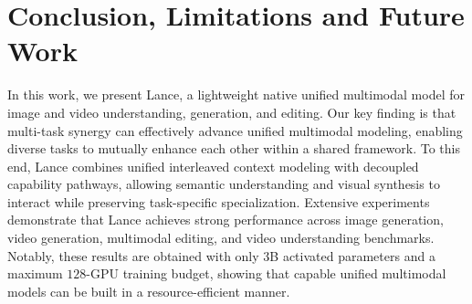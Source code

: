\documentclass{llmxive}
\providecommand{\arraystretch}{1.16}
\begin{document}
\begin{table}[t]
\centering
\setlength{\tabcolsep}{8pt}
\renewcommand{\arraystretch}{1.15}
\caption{\textbf{Ablation on Modality-Aware Rotary Positional Encoding (MaPE).} We report GenEval for image generation, GEdit for image editing, VBench for video generation, and MVBench for video understanding.}
\label{tab:ablation_mape}
\end{table}

\section{Conclusion, Limitations and Future Work}
\label{sec:Conclusion}

In this work, we present Lance, a lightweight native unified multimodal model for image and video understanding, generation, and editing. Our key finding is that multi-task synergy can effectively advance unified multimodal modeling, enabling diverse tasks to mutually enhance each other within a shared framework. To this end, Lance combines unified interleaved context modeling with decoupled capability pathways, allowing semantic understanding and visual synthesis to interact while preserving task-specific specialization. Extensive experiments demonstrate that Lance achieves strong performance across image generation, video generation, multimodal editing, and video understanding benchmarks. Notably, these results are obtained with only $3$B activated parameters and a maximum $128$-GPU training budget, showing that capable unified multimodal models can be built in a resource-efficient manner.
\end{document}

